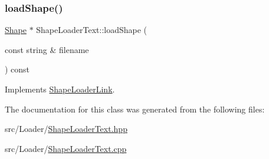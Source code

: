 \subsubsection{\texorpdfstring{load\+Shape()}{loadShape()}}
{\footnotesize\ttfamily \hyperlink{class_shape}{Shape} $\ast$ Shape\+Loader\+Text\+::load\+Shape (\begin{DoxyParamCaption}\item[{const string \&}]{filename }\end{DoxyParamCaption}) const\hspace{0.3cm}{\ttfamily [virtual]}}



Implements \hyperlink{class_shape_loader_link_a02f18caa405a1d5a1e24ed5b7bf08320}{Shape\+Loader\+Link}.



The documentation for this class was generated from the following files\+:\begin{DoxyCompactItemize}
\item 
src/\+Loader/\hyperlink{_shape_loader_text_8hpp}{Shape\+Loader\+Text.\+hpp}\item 
src/\+Loader/\hyperlink{_shape_loader_text_8cpp}{Shape\+Loader\+Text.\+cpp}\end{DoxyCompactItemize}
